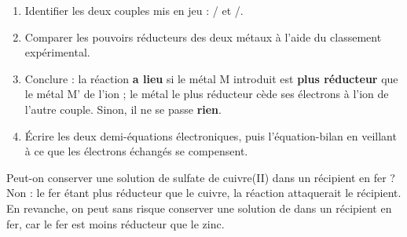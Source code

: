 \documentclass[11pt]{article}
\newcommand{\cle}[1]{{\popxbold\color{popdark}#1}}
\begin{document}
\begin{methode}
\begin{enumerate}
\item Identifier les deux couples mis en jeu : / et /.
\item Comparer les \cle{pouvoirs réducteurs} des deux métaux à l'aide du classement expérimental.
\item Conclure : la réaction \textbf{a lieu} si le métal M introduit est \textbf{plus réducteur} que le métal M' de l'ion ; le métal le plus réducteur cède ses électrons à l'ion de l'autre couple. Sinon, il ne se passe \textbf{rien}.
\item Écrire les deux demi-équations électroniques, puis l'équation-bilan en veillant à ce que les électrons échangés se compensent.
\end{enumerate}
\end{methode}

\begin{exemplebox}
Peut-on conserver une solution de sulfate de cuivre(II) dans un récipient en fer ? Non : le fer étant plus réducteur que le cuivre, la réaction  attaquerait le récipient. En revanche, on peut sans risque conserver une solution de  dans un récipient en fer, car le fer est moins réducteur que le zinc.
\end{exemplebox}
\end{document}
